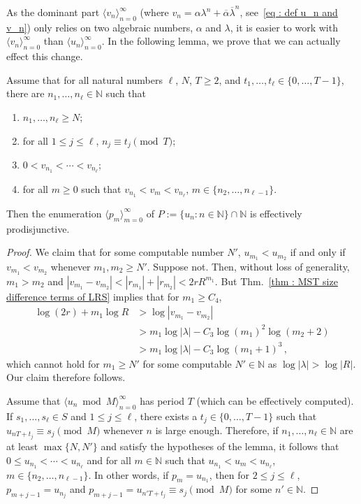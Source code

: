 \documentclass[a4paper,UKenglish,cleveref, autoref, thm-restate]{lipics-v2021}
\newcommand{\nat} {\mathbb{N}}
\begin{document}
As the dominant part $\langle v_n \rangle_{n=0}^\infty$ (where $v_n = \alpha\lambda^n+\overline{\alpha}\overline{\lambda}^n$, see~\eqref{eq : def u_n and v_n}) only relies on two algebraic numbers, $\alpha$ and $\lambda$, it is easier to work
with $\langle v_n\rangle_{n=0}^\infty$ than $\langle u_n\rangle_{n=0}^\infty$.
In the following lemma, we prove that we can actually effect this change.
\begin{lemma}\label{lem : weak normality equivalent statement}
    Assume that for all natural numbers $\ell$, $N$, $T \ge 2$, and $t_1,\dots,t_\ell \in \{0, \dots,T-1\}$, there are $n_1,\dots, n_\ell \in \nat$ such that
    \begin{enumerate}
        \item $n_1,\dots, n_\ell \ge N$;
        \item for all $1 \le j \le \ell$, $n_j \equiv t_j \pmod T$;
        \item $0 < v_{n_1} < \cdots < v_{n_\ell}$;
        \item for all $m \geq 0$ such that $v_{n_1} < v_m < v_{n_\ell}$, $m \in \{n_2,\dots,n_{\ell-1}\}$.
    \end{enumerate}
    Then the enumeration $\langle p_m \rangle_{m=0}^\infty$ of $P := \{u_n \colon n \in \nat\} \cap \nat$ is effectively prodisjunctive.
\end{lemma}
\begin{proof}
    We claim that for some computable number $N'$, $u_{m_1} < u_{m_2}$ if and only if $v_{m_1} < v_{m_2}$ whenever $m_1, m_2 \ge N'$. 
Suppose not. Then, without loss of generality, $m_1 > m_2$ and $|v_{m_1} - v_{m_2}| < |r_{m_1}| + |r_{m_2}| < 2rR^{m_1}$. 
   But Thm.~\ref{thm : MST size difference terms of LRS} implies that for $m_1 \ge C_4$,
    \begin{align*}
        \log(2r) + m_1\log R &> \log|v_{m_1} - v_{m_2}|\\
        &> m_1 \log|\lambda| - C_3 \log(m_1)^2\log(m_2+2)\\
        &> m_1 \log|\lambda| - C_3 \log(m_1+1)^3 \, ,
    \end{align*}
    which cannot hold for $m_1 \ge N'$ for some computable $N' \in
    \nat$ as $\log|\lambda| > \log|R|$. Our claim therefore follows.

    Assume that $\langle u_n\bmod M\rangle_{n=0}^\infty$ has
    period $T$ (which can be effectively computed).  If
    $s_1,\dots,s_\ell \in S$ and $1 \le j \le \ell$, there exists a
    $t_j \in \{0,\dots,T-1\}$ such that
    $u_{nT +t_j} \equiv s_j \pmod M$ whenever $n$ is large enough.
    Therefore, if $n_1,\dots,n_\ell \in \nat$ are at least $\max\{N,N'\}$
    and satisfy the hypotheses of the lemma, it follows that
    $0 \le u_{n_1} < \cdots < u_{n_\ell}$ and for all $m \in \nat$
    such that $u_{n_1} < u_m < u_{n_\ell}$,
    $m \in \{n_2,\dots,n_{\ell-1}\}$.  In other words, if $p_m = u_{n_1}$,
    then for $2 \le j \le \ell$, $p_{m+j-1} = u_{n_j}$ and
    $p_{m+j-1} = u_{n'T +t_j} \equiv s_j \pmod M$ for some
    $n' \in \nat$.
\end{proof}
\end{document}
